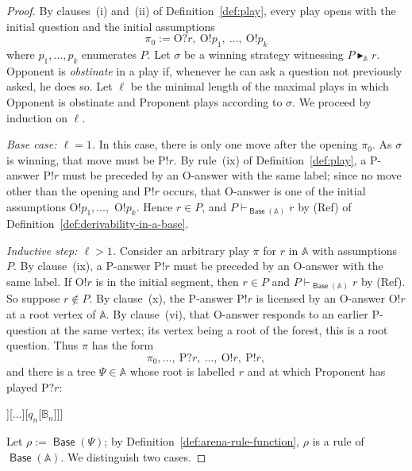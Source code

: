 \documentclass{lipics-v2021}
\newcommand{\deriv}[1]{\vdash_{#1}}       %
\newcommand{\supp}[1]{\Vdash_{#1}}
\newcommand{\wstrat}[1]{\blacktriangleright_{#1}}            %
\newcommand{\arena}[1]{\mathbb{#1}}                     %
\newcommand{\tobase}[1]{\mathrel{\textsf{Base}}(#1)}            %
\begin{document}
\begin{proof}
 By
clauses~(i) and~(ii) of Definition~\ref{def:play}, every play opens with the initial question and the initial
assumptions
\[
\pi_0 := \text{O?}r,\ \text{O!}p_1,\ \ldots,\ \text{O!}p_k
\]
where $p_1, \ldots, p_k$ enumerates $P$.
Let $\sigma$ be a winning strategy witnessing $P \wstrat{\arena{A}} r$. Opponent is \emph{obstinate} in a play if, whenever he can ask a question not previously asked, he does so.
 Let $\ell$ be the minimal length of the maximal plays in which Opponent is obstinate and Proponent plays according to $\sigma$. We proceed by induction on $\ell$.
 
\medskip
 
\noindent\emph{Base case: $\ell = 1$.} In this case, there is only one move after the opening $\pi_0$. As $\sigma$ is winning, that move must be
P!$r$. By rule~(ix) of Definition~\ref{def:play}, a P-answer P!$r$ must be
preceded by an O-answer with the same label; since no move other than the
opening and P!$r$ occurs, that O-answer is one of the initial assumptions
O!$p_1, \ldots,$ O!$p_k$. Hence $r \in P$, and $P \deriv{\tobase{\arena{A}}} r$
by (Ref) of Definition~\ref{def:derivability-in-a-base}.
 
\medskip
 
\noindent\emph{Inductive step: $\ell > 1$.} Consider an arbitrary play $\pi$ for $r$ in $\arena{A}$ with assumptions $P$. By clause~(ix), a P-answer P!$r$ must be
preceded by an O-answer with the same label. If O!$r$ is in the initial segment, then $r \in P$ and $P \deriv{\tobase{\arena{A}}} r$
by (Ref). So suppose $r \notin P$.
By clause~(x), the P-answer
P!$r$ is licensed by an O-answer O!$r$ at a root vertex of $\arena{A}$. By
clause~(vi), that O-answer responds to an earlier P-question at the same
vertex; its vertex being a root of the forest, this is a root question. Thus $\pi$ has the form
\[
\pi_0,\ldots,\ \text{P?}r,\ \ldots,\ \text{O!}r,\ \text{P!}r,
\]
and there is a tree $\Psi \in \arena{A}$ whose root is labelled $r$ and at
which Proponent has played P?$r$:
\begin{center} \small
    \begin{forest}
        [$r$[$q_1$[$\arena{B}_1$]][$\ldots$][$q_n$[$\arena{B}_n$]]]
    \end{forest}
\end{center}
Let $\rho := \tobase{\Psi}$; by Definition~\ref{def:arena-rule-function}, $\rho$ is a rule of $\tobase{\arena{A}}$.
We distinguish two cases.
 
\medskip
 

\end{proof}
\end{document}
